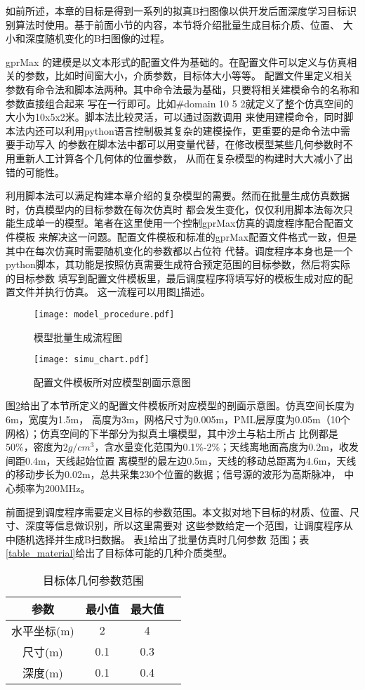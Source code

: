 如前所述，本章的目标是得到一系列的拟真B扫图像以供开发后面深度学习目标识别算法时使用。基于前面小节的内容，本节将介绍批量生成目标介质、位置、
大小和深度随机变化的B扫图像的过程。

gprMax 的建模是以文本形式的配置文件为基础的。在配置文件可以定义与仿真相关的参数，比如时间窗大小，介质参数，目标体大小等等。
配置文件里定义相关参数有命令法和脚本法两种。其中命令法最为基础，只要将相关建模命令的名称和参数直接组合起来
写在一行即可。比如\#domain 10 5 2就定义了整个仿真空间的大小为10x5x2米。脚本法比较灵活，可以通过函数调用
来使用建模命令，同时脚本法内还可以利用python语言控制极其复杂的建模操作，更重要的是命令法中需要手动写入
的参数在脚本法中都可以用变量代替，在修改模型某些几何参数时不用重新人工计算各个几何体的位置参数，
从而在复杂模型的构建时大大减小了出错的可能性。

利用脚本法可以满足构建本章介绍的复杂模型的需要。然而在批量生成仿真数据时，仿真模型内的目标参数在每次仿真时
都会发生变化，仅仅利用脚本法每次只能生成单一的模型。笔者在这里使用一个控制gprMax仿真的调度程序配合配置文件模板
来解决这一问题。配置文件模板和标准的gprMax配置文件格式一致，但是其中在每次仿真时需要随机变化的参数都以占位符
代替。调度程序本身也是一个python脚本，其功能是按照仿真需要生成符合预定范围的目标参数，然后将实际的目标参数
填写到配置文件模板里，最后调度程序将填写好的模板生成对应的配置文件并执行仿真。
这一流程可以用图\ref{gprmax_batch_model_procedure}描述。
\begin{figure}[htbp]
	\texttt{[image: model\_procedure.pdf]}
	\caption[]{模型批量生成流程图}
	\label{gprmax_batch_model_procedure}
\end{figure}
\begin{figure}[htbp]
	\texttt{[image: simu\_chart.pdf]}
	\caption[]{配置文件模板所对应模型剖面示意图}
	\label{simulation_chart}
\end{figure}

图\ref{simulation_chart}给出了本节所定义的配置文件模板所对应模型的剖面示意图。仿真空间长度为6m，宽度为1.5m，
高度为3m，网格尺寸为0.005m，PML层厚度为0.05m（10个网格）；仿真空间的下半部分为拟真土壤模型，其中沙土与粘土所占
比例都是50\%，密度为$2g/cm^3$，含水量变化范围为0.1\%-2\%；天线离地面高度为0.2m，收发间距0.4m，天线起始位置
离模型的最左边0.5m，天线的移动总距离为4.6m，天线的移动步长为0.02m，总共采集230个位置的数据；信号源的波形为高斯脉冲，
中心频率为200MHz。

前面提到调度程序需要定义目标的参数范围。本文拟对地下目标的材质、位置、尺寸、深度等信息做识别，所以这里需要对
这些参数给定一个范围，让调度程序从中随机选择并生成B扫数据。
表\ref{table_geometry}给出了批量仿真时几何参数
范围；表\ref{table_material}给出了目标体可能的几种介质类型。
\begin{table}[htbp]
	\caption{目标体几何参数范围} 
	\begin{tabular}{|c|c|c|c|} 
		\hline  
		参数 &  最小值 & 最大值 \\
		\hline 
		水平坐标(m) & 2 & 4 \\  
		\hline  
		尺寸(m) & 0.1 & 0.3 \\  
		\hline  
		深度(m) & 0.1 & 0.4 \\  
		\hline  
	\end{tabular}
	\label{table_geometry}
\end{table}

